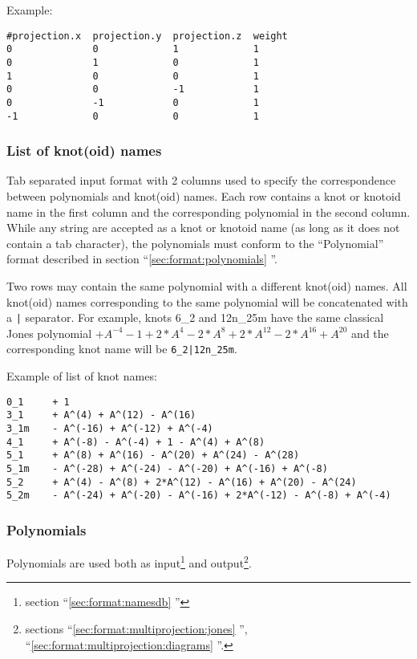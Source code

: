 Example:
\begin{lstlisting}
#projection.x  projection.y  projection.z  weight
0              0             1             1
0              1             0             1
1              0             0             1
0              0             -1            1
0              -1            0             1
-1             0             0             1
\end{lstlisting}



\subsubsection{\label{sec:format:namesdb}List of knot(oid) names}
Tab separated input format with 2 columns used to specify the correspondence between polynomials and knot(oid) names. Each row contains a knot or knotoid name in the first column and the corresponding polynomial in the second column.
While any string are accepted as a knot or knotoid name (as long as it does not contain a tab character), the polynomials must conform to the ``Polynomial'' format described in  section ``\ref{sec:format:polynomials} ''.

Two rows may contain the same polynomial with a different knot(oid) names. All knot(oid) names corresponding to the same polynomial will be concatenated  with a \lstinline{|} separator. For example, knots 6\_2 and 12n\_25m have the same classical Jones polynomial $+ A^{-4} - 1 + 2*A^{4} - 2*A^{8} + 2*A^{12} - 2*A^{16} + A^{20}$ and the  corresponding knot name will be \lstinline{6_2|12n_25m}.


Example of list of knot names:
\begin{lstlisting}
0_1     + 1
3_1     + A^(4) + A^(12) - A^(16)
3_1m    - A^(-16) + A^(-12) + A^(-4)
4_1     + A^(-8) - A^(-4) + 1 - A^(4) + A^(8)
5_1     + A^(8) + A^(16) - A^(20) + A^(24) - A^(28)
5_1m    - A^(-28) + A^(-24) - A^(-20) + A^(-16) + A^(-8)
5_2     + A^(4) - A^(8) + 2*A^(12) - A^(16) + A^(20) - A^(24)
5_2m    - A^(-24) + A^(-20) - A^(-16) + 2*A^(-12) - A^(-8) + A^(-4)
\end{lstlisting}



\subsubsection{\label{sec:format:polynomials}Polynomials}
Polynomials are used both as input\footnote{section ``\ref{sec:format:namesdb} ''} and output\footnote{sections ``\ref{sec:format:multiprojection:jones} '', ``\ref{sec:format:multiprojection:diagrams} ''.}.

